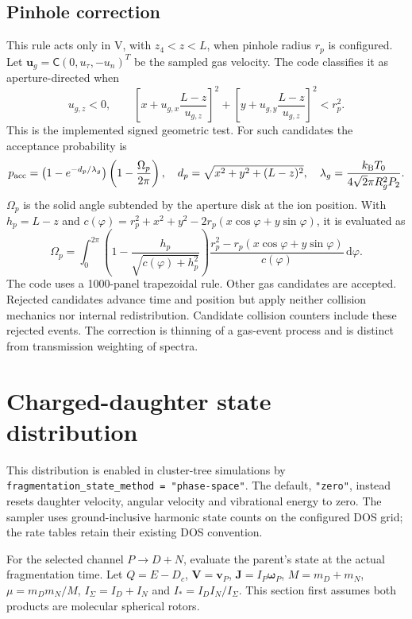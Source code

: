 \documentclass[10pt,a4paper]{article}
\newcommand{\dd}{\,\mathrm d}
\newcommand{\kb}{k_{\mathrm B}}
\begin{document}
\subsection{Pinhole correction}
This rule acts only in V, with $z_4<z<L$, when pinhole radius $r_p$ is configured.
Let $\mathbf u_g=\mathsf C(0,u_\tau,-u_n)^T$ be the sampled gas velocity.
The code classifies it as aperture-directed when
\[
 u_{g,z}<0,\qquad
 \left[x+u_{g,x}\frac{L-z}{u_{g,z}}\right]^2+
 \left[y+u_{g,y}\frac{L-z}{u_{g,z}}\right]^2<r_p^2.
\]
This is the implemented signed geometric test. For such candidates the
acceptance probability is
\begin{equation}
 p_{\rm acc}=\bigl(1-e^{-d_p/\lambda_g}\bigr)
 \left(1-\frac{\Omega_p}{2\pi}\right),\quad
 d_p=\sqrt{x^2+y^2+(L-z)^2},\quad
 \lambda_g=\frac{\kb T_0}{4\sqrt2\pi R_g^2P_2}.
\end{equation}
$\Omega_p$ is the solid angle subtended by the aperture disk at the ion
position. With $h_p=L-z$ and
$c(\varphi)=r_p^2+x^2+y^2-2r_p(x\cos\varphi+y\sin\varphi)$, it is evaluated as
\[
 \Omega_p=\int_0^{2\pi}\left(1-\frac{h_p}{\sqrt{c(\varphi)+h_p^2}}\right)
 \frac{r_p^2-r_p(x\cos\varphi+y\sin\varphi)}{c(\varphi)}\dd\varphi.
\]
The code uses a 1000-panel trapezoidal rule. Other gas candidates are accepted.
Rejected candidates advance time and position but
apply neither collision mechanics nor internal redistribution. Candidate
collision counters include these rejected events. The correction is thinning
of a gas-event process and is distinct from transmission weighting of spectra.

\clearpage
\section{Charged-daughter state distribution}\label{app:daughter}
This distribution is enabled in cluster-tree simulations by
\texttt{fragmentation\_state\_method = "phase-space"}.
The default, \texttt{"zero"}, instead resets daughter velocity, angular
velocity and vibrational energy to zero. The sampler uses ground-inclusive
harmonic state counts on the configured DOS grid; the rate tables retain
their existing DOS convention.

For the selected channel $P\to D+N$, evaluate the parent's state at the actual
fragmentation time. Let $Q=E-D_c$, $\mathbf V=\mathbf v_P$,
$\mathbf J=I_P\boldsymbol\omega_P$, $M=m_D+m_N$,
$\mu=m_Dm_N/M$, $I_\Sigma=I_D+I_N$ and $I_*=I_DI_N/I_\Sigma$.
This section first assumes both products are molecular spherical rotors.
\end{document}
